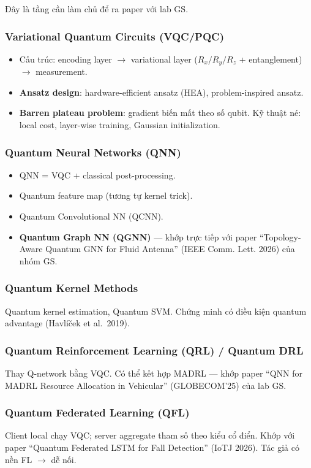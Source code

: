 \documentclass[11pt,a4paper]{article}
\begin{document}
Đây là tầng cần làm chủ để ra paper với lab GS.

\subsubsection{Variational Quantum Circuits (VQC/PQC)}
\begin{itemize}
  \item Cấu trúc: encoding layer $\rightarrow$ variational layer ($R_x/R_y/R_z$ + entanglement) $\rightarrow$ measurement.
  \item \textbf{Ansatz design}: hardware-efficient ansatz (HEA), problem-inspired ansatz.
  \item \textbf{Barren plateau problem}: gradient biến mất theo số qubit. Kỹ thuật né: local cost, layer-wise training, Gaussian initialization.
\end{itemize}

\subsubsection{Quantum Neural Networks (QNN)}
\begin{itemize}
  \item QNN = VQC + classical post-processing.
  \item Quantum feature map (tương tự kernel trick).
  \item Quantum Convolutional NN (QCNN).
  \item \textbf{Quantum Graph NN (QGNN)} --- khớp trực tiếp với paper ``Topology-Aware Quantum GNN for Fluid Antenna'' (IEEE Comm. Lett. 2026) của nhóm GS.
\end{itemize}

\subsubsection{Quantum Kernel Methods}
Quantum kernel estimation, Quantum SVM. Chứng minh có điều kiện quantum advantage (Havlíček et al.\ 2019).

\subsubsection{Quantum Reinforcement Learning (QRL) / Quantum DRL}
Thay Q-network bằng VQC. Có thể kết hợp MADRL --- khớp paper ``QNN for MADRL Resource Allocation in Vehicular'' (GLOBECOM'25) của lab GS.

\subsubsection{Quantum Federated Learning (QFL)}
Client local chạy VQC; server aggregate tham số theo kiểu cổ điển. Khớp với paper ``Quantum Federated LSTM for Fall Detection'' (IoTJ 2026). Tác giả có nền FL $\rightarrow$ dễ nối.
\end{document}
